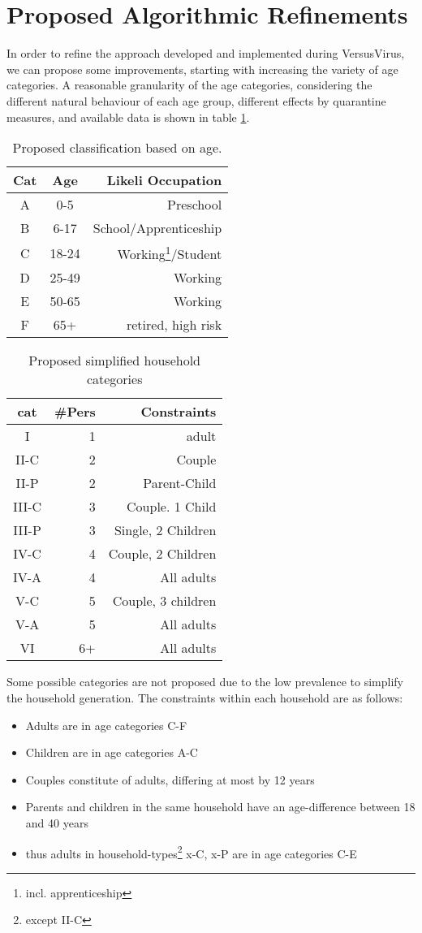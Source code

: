 \documentclass[]{scrartcl}
\begin{document}
\section{Proposed Algorithmic Refinements}
	In order to refine the approach developed and implemented during VersusVirus, we can propose some improvements, starting with increasing the variety of age categories.
	A reasonable granularity of the age categories, considering the different natural behaviour of each age group, different effects by quarantine measures, and available data is shown in table \ref{tab:Age}.
	\begin{table}
		\centering
		\begin{tabular}{c| c r}
			Cat&Age&Likeli Occupation\\
			\hline
			A& 0-5 & Preschool \\
			B&6-17 & School/Apprenticeship \\
			C&18-24 & Working\footnote{incl. apprenticeship}/Student  \\
			D&25-49 & Working\\
			E&50-65 & Working\\
			F&65+ &retired, high risk
		\end{tabular}
		\caption{Proposed classification based on age.}
		\label{tab:Age}
	\end{table}
	\begin{table}
		\centering
		\begin{tabular}{c|r r}
			cat&\#Pers&Constraints
			\\
			\hline
			I&1&adult\\
			II-C&2&Couple\\
			II-P&2&Parent-Child\\
			III-C&3&Couple. 1 Child\\
			III-P&3&Single, 2 Children\\
			IV-C&4&Couple, 2 Children\\
			IV-A&4&All adults\\
			V-C&5&Couple, 3 children\\
			V-A&5&All adults\\
			VI&6+&All adults
		\end{tabular}
		\caption{Proposed simplified household categories}
		\label{tab:HH}
	\end{table}
	Some possible categories are not proposed due to the low prevalence to simplify the household generation.
	The constraints within each household are as follows:
	\begin{itemize}
		\item Adults are in age categories C-F
		\item Children are in age categories A-C
		\item Couples constitute of adults, differing at most by 12 years
		\item Parents and children in the same household have an age-difference between 18 and 40 years
		\item thus adults in household-types\footnote{except II-C} x-C, x-P are in age categories C-E
	\end{itemize}
	
\end{document}

